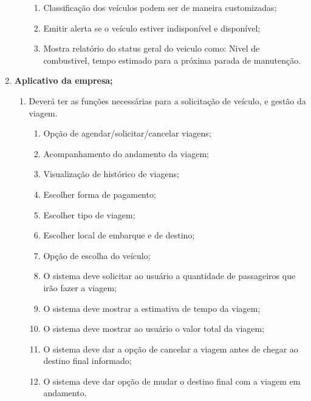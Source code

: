 \begin{enumerate}
\begin{enumerate}
\begin{enumerate}
                              \item Classificação dos veículos podem ser de maneira customizadas;
                              \item Emitir alerta se o veículo estiver indisponível e disponível;
                              \item Mostra relatório do status geral do veiculo como: Nivel de combustivel, tempo estimado para a próxima parada de manutenção.

                        \end{enumerate}
            \end{enumerate}
      \item \textbf{Aplicativo da empresa;}
            \begin{enumerate}

                  \item	Deverá ter as funções necessárias para a solicitação de veículo, e gestão da viagem.
                        \begin{enumerate}
                              \item Opção de agendar/solicitar/cancelar viagens;
                              \item Acompanhamento do andamento da viagem;
                              \item Visualização de histórico de viagens;
                              \item Escolher forma de pagamento;
                              \item Escolher tipo de viagem;
                              \item Escolher local de embarque e de destino;
                              \item  Opção de escolha do veículo;
                              \item O sistema deve solicitar ao usuário a quantidade de passageiros que irão fazer a viagem;
                              \item O sistema deve mostrar a estimativa de tempo da viagem;
                              \item O sistema deve mostrar ao usuário o valor total da viagem;
                              \item O sistema deve dar a opção de cancelar a viagem antes de chegar ao destino final informado;
                              \item O sistema deve dar opção de mudar o destino final com a viagem em andamento.



\end{enumerate}
\end{enumerate}
\end{enumerate}
